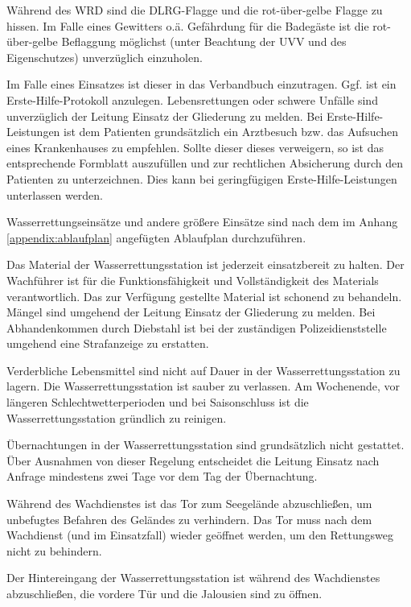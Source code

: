 Während des WRD sind die DLRG-Flagge und die rot-über-gelbe Flagge zu hissen. Im Falle eines Gewitters o.ä. Gefährdung für die Badegäste ist die rot-über-gelbe Beflaggung möglichst (unter Beachtung der UVV und des Eigenschutzes) unverzüglich einzuholen.

Im Falle eines Einsatzes ist dieser in das Verbandbuch einzutragen. 
Ggf. ist ein Erste-Hilfe-Protokoll anzulegen. 
Lebensrettungen oder schwere Unfälle sind unverzüglich der Leitung Einsatz der Gliederung zu melden. 
Bei Erste-Hilfe-Leistungen ist dem Patienten grundsätzlich ein Arztbesuch bzw. das Aufsuchen eines Krankenhauses zu empfehlen. 
Sollte dieser dieses verweigern, so ist das entsprechende Formblatt auszufüllen und zur rechtlichen Absicherung durch den Patienten zu unterzeichnen. 
Dies kann bei geringfügigen Erste-Hilfe-Leistungen unterlassen werden.

Wasserrettungseinsätze und andere größere Einsätze sind nach dem im Anhang \vref{appendix:ablaufplan} angefügten Ablaufplan durchzuführen.

Das Material der Wasserrettungsstation ist jederzeit einsatzbereit zu halten. Der Wachführer ist für die Funktionsfähigkeit und Vollständigkeit des Materials verantwortlich. Das zur Verfügung gestellte Material ist schonend zu behandeln. Mängel sind umgehend der Leitung Einsatz der Gliederung zu melden.  Bei Abhandenkommen durch Diebstahl ist bei der zuständigen Polizeidienststelle umgehend eine Strafanzeige zu erstatten. 

Verderbliche Lebensmittel sind nicht auf Dauer in der Wasserrettungsstation zu lagern. Die Wasserrettungsstation ist sauber zu verlassen. Am Wochenende, vor längeren Schlechtwetterperioden und bei Saisonschluss ist die Wasserrettungsstation gründlich zu reinigen.

Übernachtungen in der Wasserrettungsstation sind grundsätzlich nicht gestattet. Über Ausnahmen von dieser Regelung entscheidet die Leitung Einsatz nach Anfrage mindestens zwei Tage vor dem Tag der Übernachtung. 

Während des Wachdienstes ist das Tor zum Seegelände abzuschließen, um unbefugtes Befahren des Geländes zu verhindern. Das Tor muss nach dem Wachdienst (und im Einsatzfall) wieder geöffnet werden, um den Rettungsweg nicht zu behindern.

Der Hintereingang der Wasserrettungsstation ist während des Wachdienstes abzuschließen, die vordere Tür und die Jalousien sind zu öffnen.


